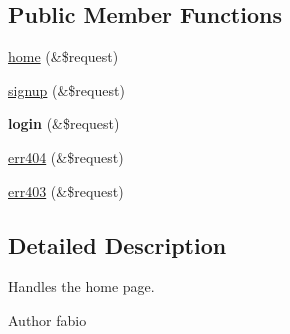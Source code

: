 \subsection*{Public Member Functions}
\begin{DoxyCompactItemize}
\item 
\hyperlink{classBasePageController_af9e63d62a5b86ea45c733a80abc58715}{home} (\&\$request)
\item 
\hyperlink{classBasePageController_a26864cbbdf6ced03397b1960f160b0eb}{signup} (\&\$request)
\item 
\hypertarget{classBasePageController_afce6b70e28e6c5086231443dd8255688}{{\bfseries login} (\&\$request)}\label{classBasePageController_afce6b70e28e6c5086231443dd8255688}

\item 
\hyperlink{classBasePageController_a0442c7e815c3940f05f007be6549833c}{err404} (\&\$request)
\item 
\hyperlink{classBasePageController_a984b448e25573a6de434b03e9f0c2795}{err403} (\&\$request)
\end{DoxyCompactItemize}


\subsection{Detailed Description}
Handles the home page.

\begin{DoxyAuthor}{Author}
fabio 
\end{DoxyAuthor}


